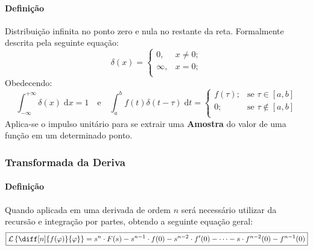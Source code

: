 \documentclass{article}
\begin{document}
            \paragraph{Definição}Distribuição infinita no ponto zero e nula no restante da reta. Formalmente descrita pela seguinte equação:
                \begin{equation}
                    \boxed{
                        \delta(x) = 
                        \begin{cases}
                            0, & x \neq 0;\\
                            \infty, & x = 0;\\
                        \end{cases}
                        }
                    \end{equation}
            Obedecendo:
                \begin{equation*}
                    \int_{-\infty}^{+\infty} \delta(x) \; \text{d}x = 1
                    \quad\text{e}\quad
                    \boxed{
                        \int_{a}^{b} f(t) \delta(t - \tau)\;\text{d}t = 
                        \begin{cases}
                            f(\tau);    & \text{se } \tau\in[a,b]\\
                            0;          & \text{se } \tau\notin[a,b]\\
                        \end{cases}
                    }
                \end{equation*}
            Aplica-se o impulso unitário para se extrair uma \textbf{Amostra} do valor de uma função em um determinado ponto.

        \subsubsection{Transformada da Deriva}
            \paragraph{Definição}Quando aplicada em uma derivada de ordem $n$ será necessário utilizar da recursão e integração por partes, obtendo a seguinte equação geral:
                \begin{equation}
                    \boxed{
                        \mathcal{L}\left\{\diff[n]{f(\varphi)}{\varphi}\right\} = 
                        s^{n}\cdot F(s) - 
                        s^{n-1} \cdot f(0) - 
                        s^{n-2} \cdot f'(0) - \dots - 
                        s \cdot f^{n-2}(0) - 
                        f^{n-1}(0)
                    }
                \end{equation}
\end{document}
